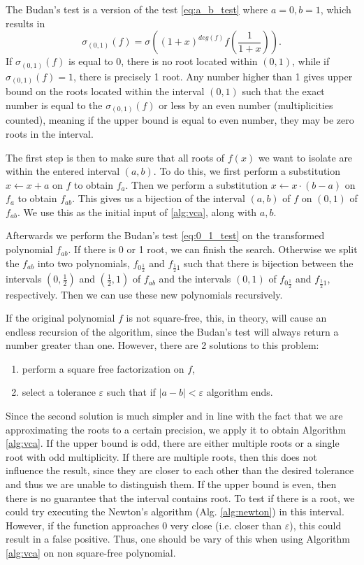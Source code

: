 \documentclass[
  digital, %
  notable,   %
  nolof,     %
  nolot,     %
	final, %
]{fithesis3}
\begin{document}
The Budan's test \parencite{budan} is a version of the test \eqref{eq:a_b_test} where $a=0, b=1$, which results in
\begin{equation}
\sigma_{\left(0,1\right)}(f) = \sigma\left((1 + x)^{deg(f)} f\left(\frac{1}{1 + x}\right)\right).
\label{eq:0_1_test}
\end{equation}
If $\sigma_{\left(0,1\right)}(f)$ is equal to 0, there is no root located within $(0,1)$, while if $\sigma_{\left(0,1\right)}(f) = 1$, there is precisely 1 root. Any number higher than 1 gives upper bound on the roots located within the interval $(0,1)$ such that the exact number is equal to the $\sigma_{\left(0,1\right)}(f)$ or less by an even number (multiplicities counted), meaning if the upper bound is equal to even number, they may be zero roots in the interval.

The first step is then to make sure that all roots of $f(x)$ we want to isolate are within the entered interval $(a,b)$. To do this, we first perform a substitution $x\leftarrow x+a$ on $f$ to obtain $f_{a}$. Then we perform a substitution $x\leftarrow x\cdot(b-a)$ on $f_{a}$ to obtain $f_{ab}$. This gives us a bijection of the interval $(a,b)$ of $f$ on $(0,1)$ of $f_{ab}$. We use this as the initial input of \ref{alg:vca}, along with $a, b$.

Afterwards we perform the Budan's test \eqref{eq:0_1_test} on the transformed polynomial $f_{ab}$. If there is 0 or 1 root, we can finish the search. Otherwise we split the $f_{ab}$ into two polynomials, $f_{0\frac{1}{2}}$ and $f_{\frac{1}{2}1}$ such that there is bijection between the intervals $(0,\frac{1}{2})$ and $(\frac{1}{2},1)$ of $f_{ab}$ and the intervals $(0,1)$ of $f_{0\frac{1}{2}}$ and $f_{\frac{1}{2}1}$, respectively. Then we can use these new polynomials recursively.

If the original polynomial $f$ is not square-free, this, in theory, will cause an endless recursion of the algorithm, since the Budan's test will always return a number greater than one. However, there are 2 solutions to this problem:
\begin{enumerate}
	\item perform a square free factorization on $f$,
	\item select a tolerance $\varepsilon$ such that if $\left|a-b\right|<\varepsilon$ algorithm ends.
\end{enumerate}
Since the second solution is much simpler and in line with the fact that we are approximating the roots to a certain precision, we apply it to obtain Algorithm \ref{alg:vca}. If the upper bound is odd, there are either multiple roots or a single root with odd multiplicity. If there are multiple roots, then this does not influence the result, since they are closer to each other than the desired tolerance and thus we are unable to distinguish them. If the upper bound is even, then there is no guarantee that the interval contains root. To test if there is a root, we could try executing the Newton's algorithm (Alg. \ref{alg:newton}) in this interval. However, if the function approaches 0 very close (i.e. closer than $\varepsilon$), this could result in a false positive. Thus, one should be vary of this when using Algorithm \ref{alg:vca} on non square-free polynomial.
\end{document}
